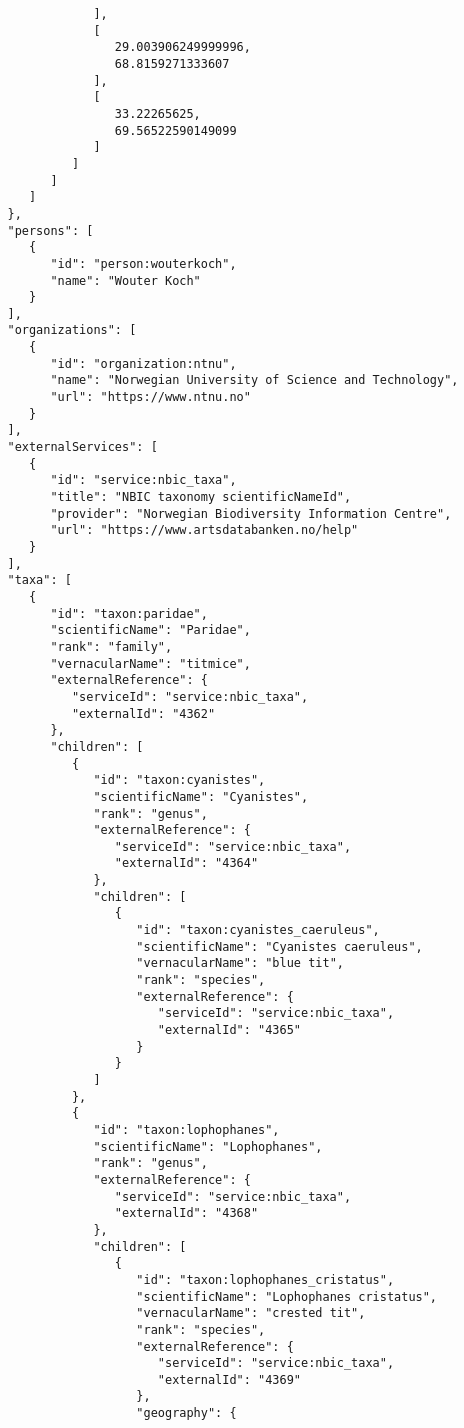 \documentclass[10pt,letterpaper]{article}
\begin{document}
\begin{verbatim}
               ],
               [
                  29.003906249999996,
                  68.8159271333607
               ],
               [
                  33.22265625,
                  69.56522590149099
               ]
            ]
         ]
      ]
   },
   "persons": [
      {
         "id": "person:wouterkoch",
         "name": "Wouter Koch"
      }
   ],
   "organizations": [
      {
         "id": "organization:ntnu",
         "name": "Norwegian University of Science and Technology",
         "url": "https://www.ntnu.no"
      }
   ],
   "externalServices": [
      {
         "id": "service:nbic_taxa",
         "title": "NBIC taxonomy scientificNameId",
         "provider": "Norwegian Biodiversity Information Centre",
         "url": "https://www.artsdatabanken.no/help"
      }
   ],
   "taxa": [
      {
         "id": "taxon:paridae",
         "scientificName": "Paridae",
         "rank": "family",
         "vernacularName": "titmice",
         "externalReference": {
            "serviceId": "service:nbic_taxa",
            "externalId": "4362"
         },
         "children": [
            {
               "id": "taxon:cyanistes",
               "scientificName": "Cyanistes",
               "rank": "genus",
               "externalReference": {
                  "serviceId": "service:nbic_taxa",
                  "externalId": "4364"
               },
               "children": [
                  {
                     "id": "taxon:cyanistes_caeruleus",
                     "scientificName": "Cyanistes caeruleus",
                     "vernacularName": "blue tit",
                     "rank": "species",
                     "externalReference": {
                        "serviceId": "service:nbic_taxa",
                        "externalId": "4365"
                     }
                  }
               ]
            },
            {
               "id": "taxon:lophophanes",
               "scientificName": "Lophophanes",
               "rank": "genus",
               "externalReference": {
                  "serviceId": "service:nbic_taxa",
                  "externalId": "4368"
               },
               "children": [
                  {
                     "id": "taxon:lophophanes_cristatus",
                     "scientificName": "Lophophanes cristatus",
                     "vernacularName": "crested tit",
                     "rank": "species",
                     "externalReference": {
                        "serviceId": "service:nbic_taxa",
                        "externalId": "4369"
                     },
                     "geography": {

\end{verbatim}
\end{document}
